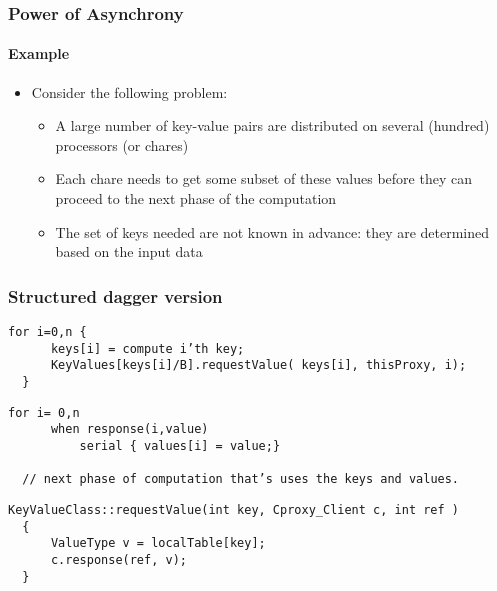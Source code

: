 \begin{frame}[fragile]

  \frametitle{Power of Asynchrony}
  \framesubtitle{Example}

  \begin{itemize}
    \item Consider the following problem:
    \begin{itemize}
      \item A large number of key-value pairs are distributed on several (hundred) processors  (or chares)
      \pause
      \item Each chare needs to get some subset of these values before they can proceed to the next phase of the computation
      \pause 
      \item The set of keys needed are not known in advance: they are determined based on the input data
    \end{itemize}
  \end{itemize}
\end{frame}

\begin{frame}[fragile]
  \frametitle{Structured dagger version}
  \begin{lstlisting}[basicstyle=\footnotesize]
  for i=0,n {
      keys[i] = compute i’th key;
      KeyValues[keys[i]/B].requestValue( keys[i], thisProxy, i); 
  }
  \end{lstlisting}
  \pause
  \begin{lstlisting}[basicstyle=\footnotesize]
  for i= 0,n 
      when response(i,value)
          serial { values[i] = value;}

  // next phase of computation that’s uses the keys and values.
  \end{lstlisting}
  \pause
  \begin{lstlisting}[basicstyle=\footnotesize]
  KeyValueClass::requestValue(int key, Cproxy_Client c, int ref )
  {  
      ValueType v = localTable[key];
      c.response(ref, v); 
  }
  \end{lstlisting}
\end{frame}



